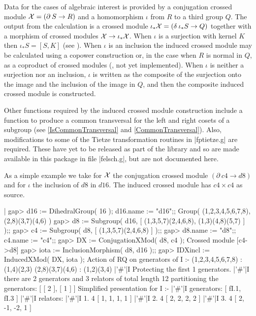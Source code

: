 Data for the cases of algebraic interest  is provided by a conjugation
crossed module ${\cal X} =  (\partial \: S \to  R)$ and a homomorphism
$\iota$  from   $R$  to a  third   group  $Q$.   The  output  from the
calculation is   a crossed module  $\iota_{\ast}{\cal  X} = (\delta \:
\iota_{\ast}S  \to Q)$ together  with   a morphism of crossed  modules
${\cal X}  \to \iota_{\ast}{\cal  X}$.   When $\iota$ is  a surjection
with kernel $K$ then $\iota_{\ast} S =  [S,K]$ (see \cite{xmodBH1}).  When
$\iota$ is an  inclusion the induced  crossed module may be calculated
using  a copower construction  \cite{xmodBW1} or, in  the case when $R$ is
normal in $Q$, as a coproduct  of crossed modules (\cite{xmodBW2}, not yet
implemented).  When $\iota$ is  neither a surjection nor an inclusion,
$\iota$ is written as  the composite of the  surjection onto the image
and the inclusion of the image in  $Q$, and then the composite induced
crossed module is constructed.

Other functions  required  by the induced  crossed module construction
include a  function to produce a common  transversal  for the left and
right cosets  of   a   subgroup (see \ref{IsCommonTransversal}     and
\ref{CommonTransversal}).  Also, modifications to  some of  the Tietze
transformation routines in  |fptietze.g| are required.  These have yet
to be released as part of the {\GAP} library and so are made available
in this package in file |felsch.g|, but are not documented here.

As a simple example  we take for ${\cal   X}$ the conjugation  crossed
module $(\partial \: c4 \to d8)$ and for $\iota$ the inclusion of $d8$
in $d16$.  The induced crossed module has $c4 \times c4$ as source.

|    gap> d16 := DihedralGroup( 16 );  d16.name := "d16";;
    Group( (1,2,3,4,5,6,7,8), (2,8)(3,7)(4,6) )
    gap> d8 := Subgroup( d16, [ (1,3,5,7)(2,4,6,8), (1,3)(4,8)(5,7) ] );;
    gap> c4 := Subgroup( d8, [ (1,3,5,7)(2,4,6,8) ] );;
    gap> d8.name :=  "d8";;  c4.name := "c4";;
    gap> DX := ConjugationXMod( d8, c4 );
    Crossed module [c4->d8]
    gap> iota := InclusionMorphism( d8, d16 );;
    gap> IDXincl := InducedXMod( DX, iota );
    Action of RQ on generators of I :- 
      (1,2,3,4,5,6,7,8) : (1,4)(2,3)
      (2,8)(3,7)(4,6) : (1,2)(3,4)
    |'\#'|I  Protecting the first 1 generators.
    |'\#'|I  there are 2 generators and 3 relators of total length 12
    partitioning the generators: [ [ 2 ], [ 1 ] ]
    Simplified presentation for I :- 
    |'\#'|I  generators: [ fI.1, fI.3 ]
    |'\#'|I  relators:
    |'\#'|I  1.  4  [ 1, 1, 1, 1 ]
    |'\#'|I  2.  4  [ 2, 2, 2, 2 ]
    |'\#'|I  3.  4  [ 2, -1, -2, 1 ]

